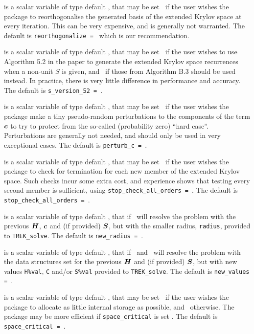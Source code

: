 \documentclass{galahad}
\newcommand{\packagename}{TREK}
\begin{document}
\begin{description}
 is a scalar variable of type default \logical, that
may be set \true\ if the user wishes the package to reorthogonalise
the generated basis of the extended Krylov space at every iteration.
This can be very expensive, and is generally not warranted.
The default is {\tt reorthogonalize = \false} which is our recommendation.

 is a scalar variable of type default \logical, that
may be set \true\ if the user wishes to use Algorithm 5.2 in the
paper to generate the extended Krylov space recurrences when a non-unit $S$
is given, and \false\ if those from Algorithm B.3 should be used instead.
In practice, there is very little difference in performance and accuracy.
The default is {\tt s\_version\_52 = \true}.

 is a scalar variable of type default \logical, that
may be set \true\ if the user wishes the package make a tiny 
pseudo-random perturbations to the components of the term ${\bm{c}}$ 
to try to protect from the so-called (probability zero) ``hard case''.
Perturbations are generally not needed, and should only be used in
very exceptional cases.
The default is {\tt perturb\_c = \false}.

 is a scalar variable of type default \logical, 
that may be set \true\ if the user wishes the package to check for termination
for each new member of the extended Krylov space. Such checks incur some extra
cost, and experience shows that testing every second member is sufficient, 
using {\tt stop\_check\_all\_orders = \false}.
The default is {\tt stop\_check\_all\_orders = \false}.

 is a scalar variable of type 
default \logical, that if \true\ will resolve the 
problem with the previous ${\bm{H}}$, ${\bm{c}}$ and (if provided) ${\bm{S}}$, but
with the smaller radius, {\tt radius}, 
provided to {\tt \packagename\_solve}.
The default is {\tt new\_radius = \false}.

 is a scalar variable of type 
default \logical, that if \present\ and \true\ will resolve the 
problem with the data structures set for the previous 
${\bm{H}}$ and (if provided) ${\bm{S}}$, but with new values {\tt H\%val}, {\tt C} 
and/or {\tt S\%val} provided to {\tt \packagename\_solve}.
The default is {\tt new\_values = \false}.

 is a scalar variable of type default \logical, that
may be set \true\ if the user wishes the package to allocate as little
internal storage as possible, and \false\ otherwise. The package may
be more efficient if {\tt space\_critical} is set \false.
The default is {\tt space\_critical = \false}.


\end{description}
\end{document}
